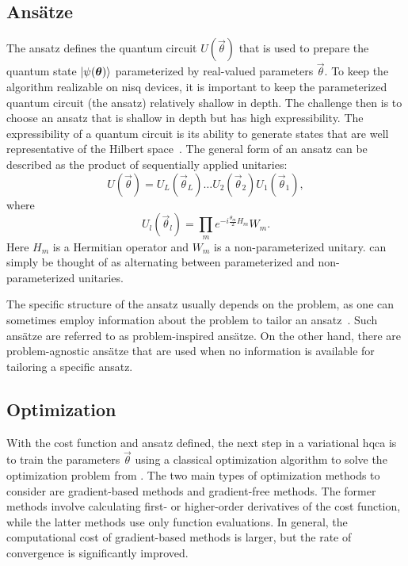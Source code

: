 \subsection{Ans{\"a}tze}
The ansatz defines the quantum circuit $U(\vec{\theta})$ that is used to prepare the quantum state $\vert{\psi(\bm{\theta})}\rangle$ parameterized by real-valued parameters $\vec{\theta}$.
To keep the algorithm realizable on \gls{nisq} devices, it is important to keep the parameterized quantum circuit (the ansatz) relatively shallow in depth.
The challenge then is to choose an ansatz that is shallow in depth but has high expressibility.
The expressibility of a quantum circuit is its ability to generate states that are well representative of the Hilbert space~\cite{sim2019expressibility}.
The general form of an ansatz can be described as the product of sequentially applied unitaries:
\begin{equation}
U(\vec{\theta}) = U_L(\vec{\theta}_L) \ldots U_2(\vec{\theta}_2)U_1(\vec{\theta}_1),
\end{equation}
where
\begin{equation} \label{eqn:ansatz-unitary}
U_l(\vec{\theta}_l) = \prod_{m} e^{-i \tfrac{\theta_m}{2} H_m}W_m.
\end{equation}
Here $H_m$ is a Hermitian operator and $W_m$ is a non-parameterized unitary.
 can simply be thought of as alternating between parameterized and non-parameterized unitaries.

The specific structure of the ansatz usually depends on the problem, as one can sometimes employ information about the problem to tailor an ansatz~\cite{cerezo2020variational}.
Such ans{\"a}tze are referred to as problem-inspired ans{\"a}tze.
On the other hand, there are problem-agnostic ans{\"a}tze that are used when no information is available for tailoring a specific ansatz.

\subsection{Optimization}
With the cost function and ansatz defined, the next step in a variational \gls{hqca} is to train the parameters $\vec{\theta}$ using a classical optimization algorithm to solve the optimization problem from .
The two main types of optimization methods to consider are gradient-based methods and gradient-free methods.
The former methods involve calculating first- or higher-order derivatives of the cost function, while the latter methods use only function evaluations.
In general, the computational cost of gradient-based methods is larger, but the rate of convergence is significantly improved.

